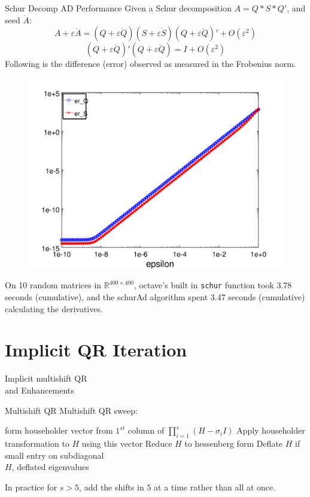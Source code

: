 \documentclass[12pt]{beamer}
\renewcommand{\d}[1]{\dot{#1}}
\newcommand{\e}{\varepsilon}
\begin{document}
  \begin{frame}{Schur Decomp AD Performance}
    Given a Schur decomposition $A = Q*S*Q'$, and seed $\d{A}$: 
    \[A + \e\d{A} = (Q + \e \d{Q})(S + \e \d{S})(Q + \e \d{Q})' + O(\e^2)\]
    \[ (Q + \e \d{Q})'(Q + \e \d{Q}) = I + O(\e^2)\]
    Following is the difference (error) observed as measured in the Frobenius norm.
    \begin{figure}[h!]
      \centering
      \includegraphics[width = .3\textwidth]{schurErr}
    \end{figure}
    On 10 random matrices in $\mathbb{R}^{400 \times 400}$, octave's built in \texttt{schur} function took 3.78 seconds (cumulative),
    and the schurAd algorithm spent 3.47 seconds (cumulative) calculating the derivatives.
  \end{frame}

	\section{Implicit QR Iteration}
	\begin{frame}{}
	  \centering
    {\huge Implicit multishift QR \\and Enhancements}
	\end{frame}

  \begin{frame}{Multishift QR}
    Multishift QR sweep:
    \begin{algorithmic}
        \State form householder vector from $1^{st}$ column of $\prod_{i=1}^{s}(H - \sigma_i I)$
        \State Apply householder transformation to $H$ using this vector
        \State Reduce $H$ to hessenberg form
        \State Deflate $H$ if small entry on subdiagonal\\
        \Return $H$, deflated eigenvalues
      \EndFunction
    \end{algorithmic}
    In practice for $s > 5$, add the shifts in $5$ at a time rather than all at once.\cite{}
  \end{frame}
\end{document}
